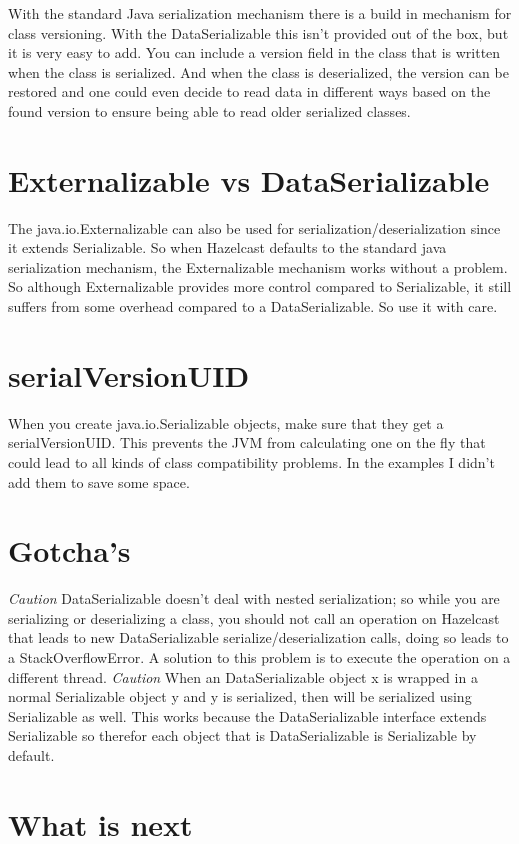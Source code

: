 With the standard Java serialization mechanism there is a build in mechanism for class versioning. With the DataSerializable this isn't provided out of the box, but it is very easy to add. You can include a version field in the class that is written when the class is serialized. And when the class is deserialized, the version can be restored and one could even decide to read data in different ways based on the found version to ensure being able to read older serialized classes.

\section{Externalizable vs DataSerializable}
The java.io.Externalizable can also be used for serialization/deserialization since it extends Serializable. So when Hazelcast defaults to the standard java serialization mechanism, the Externalizable mechanism works without a problem. So although Externalizable provides more control compared to Serializable, it still suffers from some overhead compared to a DataSerializable. So use it with care.

\section{serialVersionUID} 
When you create java.io.Serializable objects, make sure that they get a serialVersionUID. This prevents the JVM from calculating one on the fly that could lead to all kinds of class compatibility problems. In the examples I didn't add them to save some space.

\section{Gotcha's}
\emph{Caution} DataSerializable doesn't deal with nested serialization; so while you are serializing or deserializing a class, you should not call an operation on Hazelcast that leads to new DataSerializable serialize/deserialization calls,  doing so leads to a StackOverflowError. A solution to this problem is to execute the operation on a different thread. 
\emph{Caution} When an DataSerializable object x is wrapped in a normal Serializable object y and y is serialized, then will be serialized using Serializable as well. This works because the DataSerializable interface extends Serializable so therefor each object that is DataSerializable is Serializable by default.

\section{What is next}